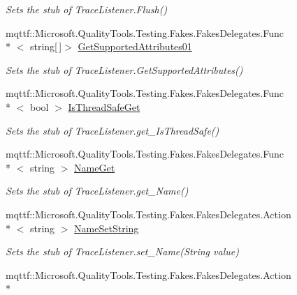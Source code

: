 \begin{DoxyCompactItemize}
\begin{DoxyCompactList}\small\item\em Sets the stub of Trace\-Listener.\-Flush()\end{DoxyCompactList}\item 
mqttf\-::\-Microsoft.\-Quality\-Tools.\-Testing.\-Fakes.\-Fakes\-Delegates.\-Func\\*
$<$ string\mbox{[}$\,$\mbox{]}$>$ \hyperlink{class_system_1_1_diagnostics_1_1_fakes_1_1_stub_default_trace_listener_abfa7c950ced3522caa9db4146b15de63}{Get\-Supported\-Attributes01}
\begin{DoxyCompactList}\small\item\em Sets the stub of Trace\-Listener.\-Get\-Supported\-Attributes()\end{DoxyCompactList}\item 
mqttf\-::\-Microsoft.\-Quality\-Tools.\-Testing.\-Fakes.\-Fakes\-Delegates.\-Func\\*
$<$ bool $>$ \hyperlink{class_system_1_1_diagnostics_1_1_fakes_1_1_stub_default_trace_listener_ab92e07ba13230a20465000114613a312}{Is\-Thread\-Safe\-Get}
\begin{DoxyCompactList}\small\item\em Sets the stub of Trace\-Listener.\-get\-\_\-\-Is\-Thread\-Safe()\end{DoxyCompactList}\item 
mqttf\-::\-Microsoft.\-Quality\-Tools.\-Testing.\-Fakes.\-Fakes\-Delegates.\-Func\\*
$<$ string $>$ \hyperlink{class_system_1_1_diagnostics_1_1_fakes_1_1_stub_default_trace_listener_a1949c8960e458ddac470ea0830771356}{Name\-Get}
\begin{DoxyCompactList}\small\item\em Sets the stub of Trace\-Listener.\-get\-\_\-\-Name()\end{DoxyCompactList}\item 
mqttf\-::\-Microsoft.\-Quality\-Tools.\-Testing.\-Fakes.\-Fakes\-Delegates.\-Action\\*
$<$ string $>$ \hyperlink{class_system_1_1_diagnostics_1_1_fakes_1_1_stub_default_trace_listener_abce1b50d9ff55c8528782265e40d8009}{Name\-Set\-String}
\begin{DoxyCompactList}\small\item\em Sets the stub of Trace\-Listener.\-set\-\_\-\-Name(\-String value)\end{DoxyCompactList}\item 
mqttf\-::\-Microsoft.\-Quality\-Tools.\-Testing.\-Fakes.\-Fakes\-Delegates.\-Action\\*

\end{DoxyCompactItemize}
